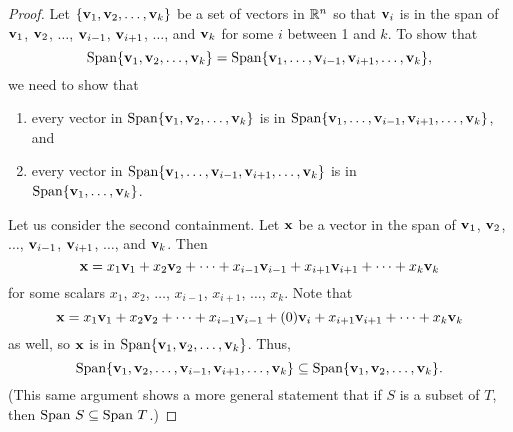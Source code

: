 \begin{proof} Let $\{\mathbf{v}_1, \mathbf{v}_2, \ldots, \mathbf{v}_k\}$ be a set of vectors in $\mathbb{R}^n$ so that $\mathbf{v}_i$ is in the span of $\mathbf{v}_1$, $\mathbf{v}_2$, $\ldots$, $\mathbf{v}_{i-1}$, $\mathbf{v}_{i+1}$, $\ldots$, and $\mathbf{v}_k$ for some $i$ between 1 and $k$. To show that 
\[\text{Span} \{\mathbf{v}_1, \mathbf{v}_2, \ldots, \mathbf{v}_k\} = \text{Span} \{\mathbf{v}_1,  \ldots, \mathbf{v}_{i-1}, \mathbf{v}_{i+1}, \ldots, \mathbf{v}_k\},\]
we need to show that
\begin{enumerate}
\item every vector in $\text{Span} \{\mathbf{v}_1, \mathbf{v}_2, \ldots, \mathbf{v}_k\}$ is in $\text{Span}\{\mathbf{v}_1, \ldots, \mathbf{v}_{i-1}, \mathbf{v}_{i+1}, \ldots, \mathbf{v}_k\}$, and
\item every vector in $\text{Span} \{\mathbf{v}_1,  \ldots, \mathbf{v}_{i-1}, \mathbf{v}_{i+1}, \ldots, \mathbf{v}_k\}$ is in \\ $\text{Span} \{\mathbf{v}_1, \ldots, \mathbf{v}_k\}$.
\end{enumerate}
Let us consider the second containment. Let $\mathbf{x}$ be a vector in the span of $\mathbf{v}_1$, $\mathbf{v}_2$, $\ldots$, $\mathbf{v}_{i-1}$, $\mathbf{v}_{i+1}$, $\ldots$, and $\mathbf{v}_k$. Then
\[\mathbf{x} = x_1\mathbf{v}_1 + x_2\mathbf{v}_2 + \cdots + x_{i-1}\mathbf{v}_{i-1} + x_{i+1}\mathbf{v}_{i+1} + \cdots + x_k\mathbf{v}_k\]
for some scalars $x_1$, $x_2$, $\ldots$, $x_{i-1}$, $x_{i+1}$, $\ldots$, $x_k$. Note that
\[\mathbf{x} = x_1\mathbf{v}_1 + x_2\mathbf{v}_2 + \cdots + x_{i-1}\mathbf{v}_{i-1} + (0)\mathbf{v}_i + x_{i+1}\mathbf{v}_{i+1} + \cdots + x_k\mathbf{v}_k\]
as well, so $\mathbf{x}$ is in $\text{Span} \{\mathbf{v}_1, \mathbf{v}_2, \ldots, \mathbf{v}_k\}$. Thus, 
\[\text{Span} \{\mathbf{v}_1, \mathbf{v}_2, \ldots, \mathbf{v}_{i-1}, \mathbf{v}_{i+1}, \ldots, \mathbf{v}_k\} \subseteq  \text{Span} \{\mathbf{v}_1, \mathbf{v}_2, \ldots, \mathbf{v}_k\}.\]
(This same argument shows a more general statement that if $S$ is a subset of $T$, then $\Span \ S \subseteq \Span \ T$.)


\end{proof}
